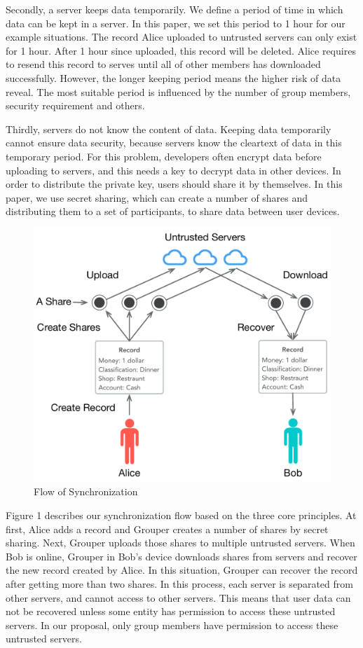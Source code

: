 \documentclass[twocolumn,10pt]{article}
\begin{document}
Secondly, a server keeps data temporarily. We define a period of time in which data can be kept in a server. In this paper, we set this period to 1 hour for our example situations. The record Alice uploaded to untrusted servers can only exist for 1 hour. After 1 hour since uploaded, this record will be deleted. Alice requires to resend this record to serves until all of other members has downloaded successfully. However, the longer keeping period means the higher risk of data reveal. The most suitable period is influenced by the number of group members, security requirement and others. 

Thirdly, servers do not know the content of data. Keeping data temporarily cannot ensure data security, because servers know the cleartext of data in this temporary period. For this problem, developers often encrypt data before uploading to servers, and this needs a key to decrypt data in other devices. In order to distribute the private key, users should share it by themselves. In this paper, we use secret sharing, which can create a number of shares and distributing them to a set of participants\cite{smith2013layered}, to share data between user devices.

\begin{figure}[t]
\centering
\includegraphics[scale=0.35]{sync_flow}
\caption{Flow of Synchronization}
\end{figure}

Figure 1 describes our synchronization flow based on the three core principles. At first, Alice adds a record and Grouper creates a number of shares by secret sharing. Next, Grouper uploads those shares to multiple untrusted servers. When Bob is online, Grouper in Bob's device downloads shares from servers and recover the new record created by Alice. In this situation, Grouper can recover the record after getting more than two shares. In this process, each server is separated from other servers, and cannot access to other servers. This means that user data can not be recovered unless some entity has permission to access these untrusted servers. In our proposal, only group members have permission to access these untrusted servers.
\end{document}
